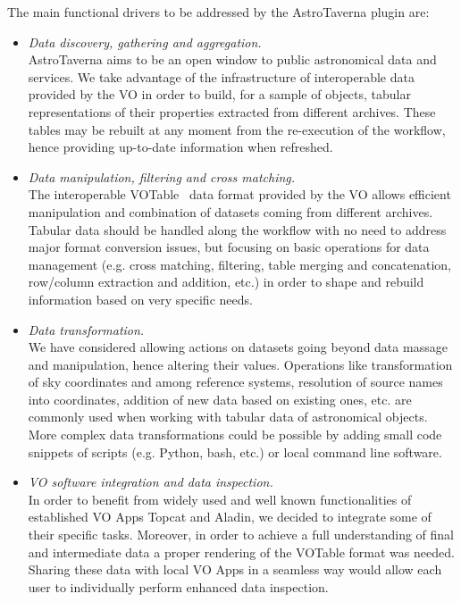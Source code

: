 \documentclass[final,authoryear,5p,times,twocolumn]{elsarticle}
\begin{document}
The main functional drivers to be addressed by the AstroTaverna plugin are:
\begin{itemize}
\item
\textit{Data discovery, gathering and aggregation.}\\
AstroTaverna aims to be an open window to public astronomical data and services. We take advantage of the infrastructure of interoperable data provided by the VO in order to build, for a sample of objects, tabular representations of their properties extracted from different archives. These tables may be rebuilt at any moment from the re-execution of the workflow, hence providing up-to-date information when refreshed.
\item
\textit{Data manipulation, filtering and cross matching.}\\
The interoperable VOTable~\citep{Ochsenbein2009} data format provided by the VO allows efficient manipulation and combination of datasets coming from different archives. Tabular data should be handled along the workflow with no need to address major format conversion issues, but focusing on basic operations for data management (e.g. cross matching, filtering, table merging and concatenation, row/column extraction and addition, etc.) in order to shape and rebuild information based on very specific needs.
\item
\textit{Data transformation.}\\
We have considered allowing actions on datasets going beyond data massage and manipulation, hence altering their values. Operations like transformation of sky coordinates and among reference systems, resolution of source names into coordinates, addition of new data based on existing ones, etc. are commonly used when working with tabular data of astronomical objects. More complex data transformations could be possible by adding small code snippets of scripts (e.g. Python, bash, etc.) or local command line software.
\item
\textit{VO software integration and data inspection.}\\
In order to benefit from widely used and well known functionalities of established VO Apps Topcat and Aladin, we decided to integrate some of their specific tasks. Moreover, in order to achieve a full understanding of final and intermediate data a proper rendering of the VOTable format was needed. Sharing these data with local VO Apps in a seamless way would allow each user to individually perform enhanced data inspection.
\end{itemize}
\end{document}

